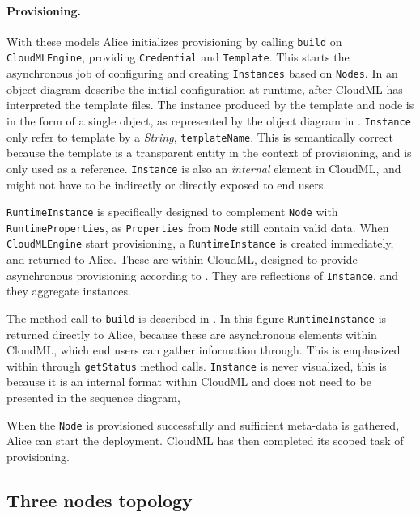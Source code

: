 \paragraph{Provisioning.}



With these models Alice initializes provisioning by calling 
\texttt{build} on \texttt{CloudMLEngine}, providing \texttt{Credential} and \texttt{Template}.
This starts the asynchronous job of configuring and creating 
\texttt{Instances} based on \texttt{Nodes}.
In  an object diagram describe the initial configuration at runtime,
after CloudML has interpreted the template files.
The instance produced by the template and node is in the form of a single object,
as represented by the object diagram in .
\texttt{Instance} only refer to template by a \emph{String}, \texttt{templateName}.
This is semantically correct because the template is a transparent entity
in the context of provisioning, and is only used as a reference.
\texttt{Instance} is also an \emph{internal} element in CloudML, and might not 
have to be indirectly or directly exposed to end users.

\texttt{RuntimeInstance} is specifically designed to complement \texttt{Node} with \texttt{RuntimeProperties},
as \texttt{Properties} from \texttt{Node} still contain valid data.
When \texttt{CloudMLEngine} start provisioning, a \texttt{RuntimeInstance} is created immediately,
and returned to Alice.
These are  within CloudML, designed to provide asynchronous provisioning
according to .
They are reflections of \texttt{Instance}, and they aggregate instances.

The method call to \texttt{build} is described in .
In this figure \texttt{RuntimeInstance} is returned directly to Alice,
because these are asynchronous elements within CloudML, which end users can gather 
information through.
This is emphasized within  through \texttt{getStatus} method calls.
\texttt{Instance} is never visualized, this is because it is an internal format
within CloudML and does not need to be presented in the sequence diagram,

When the \texttt{Node} is provisioned successfully and sufficient meta-data is gathered,
Alice can start the deployment.
CloudML has then completed its scoped task of provisioning.

\subsection{Three nodes topology}

